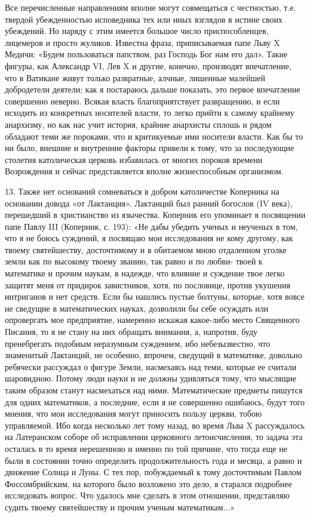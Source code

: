 Все перечисленные направлениям вполне могут совмещаться с честностью,
т.е. твердой убежденностью исповедника тех или иных взглядов в истине
своих убеждений. Но наряду с этим имеется большое число
приспособленцев, лицемеров и просто жуликов. Известна фраза,
приписываемая папе Льву X Медичи: «Будем пользоваться папством, раз
Господь Бог нам его дал». Такие фигуры, как Александр VI, Лев X и
другие, конечно, производят впечатление, что в Ватикане живут только
развратные, алчные, лишенные малейшей добродетели деятели; как я
постараюсь дальше показать, это первое впечатление совершенно неверно.
Всякая власть благоприятствует развращению, и если исходить из
конкретных носителей власти, то легко прийти к самому крайнему
анархизму, но как нас учит история, крайние анархисты сплошь и рядом
обладают теми же пороками, что и критикуемые ими носители власти. Как
бы то ни было, внешние и внутренние факторы привели к тому, что за
последующие столетия католическая церковь избавилась от многих пороков
времени Возрождения и сейчас представляется вполне жизнеспособным
организмом.

13. Также нет оснований сомневаться в добром католичестве Коперника на
основании довода «от Лактанция». Лактанций был ранний богослов (IV
века), перешедший в христианство из язычества. Коперник его упоминает
в посвящении папе Павлу III (Коперник, с. 193): «Не дабы убедить
ученых и неученых в том, что я не боюсь суждений, я посвящаю мои
исследования не кому другому, как твоему святейшеству, досточтимому и
в обитаемом мною отдаленном уголке земли как по высокому твоему
званию, так равно и по любви- твоей к математике и прочим наукам, в
надежде, что влияние и суждение твое легко защитят меня от придирок
завистников, хотя, по пословице, против укушения интриганов и нет
средств. Если бы нашлись пустые болтуны, которые, хотя вовсе не
сведущие в математических науках, дозволили бы себе осуждать или
опровергать мое предприятие, намеренно искажая какое-либо место
Священного Писания, то я не стану на них обращать внимания, а,
напротив, буду пренебрегать подобным неразумным суждением, ибо
небезызвестно, что знаменитый Лактанций, не особенно, впрочем,
сведущий в математике, довольно ребячески рассуждал о фигуре Земли,
насмехаясь над теми, которые ее считали шаровидною. Потому люди науки
и не должны удивляться тому, что мыслящие таким образом станут
насмехаться над ними. Математические предметы пишутся для одних
математиков, а последние, если я не совершенно ошибаюсь, будут того
мнения, что мои исследования могут приносить пользу церкви, тобою
управляемой. Ибо когда несколько лет тому назад, во время Льва X
рассуждалось на Латеранском соборе об исправлении церковного
летоисчисления, то задача эта осталась в то время нерешенною и именно
по той причине, что тогда еще не были в состоянии точно определить
продолжительность года и месяца, а равно и движение Солнца и Луны. С
тех пор, побуждаемый к тому досточтимым Павлом Фоссомбрийским, на
которого было возложено это дело, я старался подробнее исследовать
вопрос. Что удалось мне сделать в этом отношении, представляю судить
твоему святейшеству и прочим ученым математикам...»

